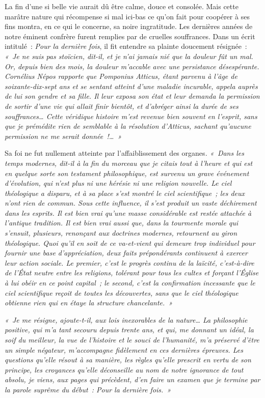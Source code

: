 \documentclass[french,twoside]{book} %
\newcommand\orgName[1]{#1}
\newcommand\persName[1]{#1}
\begin{document}
La fin d’une si belle vie aurait dû être calme, douce et consolée. Mais cette marâtre nature qui récompense si mal ici-bas ce qu’on fait pour coopérer à ses fins montra, en ce qui le concerne, sa noire ingratitude. Les dernières années de notre éminent confrère furent remplies par de cruelles souffrances. Dans un écrit intitulé : \emph{Pour la dernière fois}, il fit entendre sa plainte doucement résignée : \emph{« Je ne suis pas stoïcien, dit-il, et je n’ai jamais nié que la douleur fût un mal. Or, depuis bien des mois, la douleur m’accable avec une persistance désespérante. {\persName Cornélius Népos} rapporte que {\persName Pomponius Atticus}, étant parvenu à l’âge de soixante-dix-sept ans et se sentant atteint d’une maladie incurable, appela auprès de lui son gendre et sa fille. Il leur exposa son état et leur demanda la permission de sortir d’une vie qui allait finir bientôt, et d’abréger ainsi la durée de ses souffrances… Cette véridique histoire m’est revenue bien souvent en l’esprit, sans que je prémédite rien de semblable à la résolution d’{\persName Atticus}, sachant qu’aucune permission ne me serait donnée !… »}\par
Sa foi ne fut nullement atteinte par l’affaiblissement des organes\emph{. « Dans les temps modernes, dit-il à la fin du morceau que je citais tout à l’heure et qui est en quelque sorte son testament philosophique, est survenu un grave événement d’évolution, qui n’est plus ni une hérésie ni une religion nouvelle. Le ciel théologique a disparu, et à sa place s’est montré le ciel scientifique ; les deux n’ont rien de commun. Sous cette influence, il s’est produit un vaste déchirement dans les esprits. Il est bien vrai qu’une masse considérable est restée attachée à l’antique tradition. Il est bien vrai aussi que, dans la tourmente morale qui s’ensuit, plusieurs, renonçant aux doctrines modernes, retournent au giron théologique. Quoi qu’il en soit de ce va-et-vient qui demeure trop individuel pour fournir une base d’appréciation, deux faits prépondérants continuent à exercer leur action sociale. Le premier, c’est le progrès continu de la laïcité, c’est-à-dire de l’État neutre entre les religions, tolérant pour tous les cultes et forçant l’{\orgName Église} à lui obéir en ce point capital ; le second, c’est la confirmation incessante que le ciel scientifique reçoit de toutes les découvertes, sans que le ciel théologique obtienne rien qui en étaye la structure chancelante. »}\par
\emph{« Je me résigne, ajoute-t-il, aux lois inexorables de la nature… La philosophie positive, qui m’a tant secouru depuis trente ans, et qui, me donnant un idéal, la soif du meilleur, la vue de l’histoire et le souci de l’humanité, m’a préservé d’être un simple négateur, m’accompagne fidèlement en ces dernières épreuves. Les questions qu’elle résout à sa manière, les règles qu’elle prescrit en vertu de son principe, les croyances qu’elle déconseille au nom de notre ignorance de tout absolu, je viens, aux pages qui précèdent, d’en faire un examen que je termine par la parole suprême du début : Pour la dernière fois. »}\par
\end{document}
